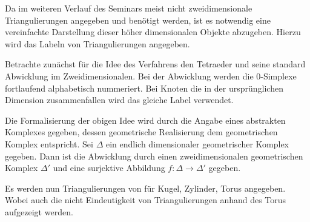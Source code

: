 \begin{Bem}
  Da im weiteren Verlauf des Seminars meist nicht zweidimensionale
  Triangulierungen angegeben und benötigt werden, ist es notwendig
  eine vereinfachte Darstellung dieser höher dimensionalen Objekte
  abzugeben. Hierzu wird das Labeln von Triangulierungen angegeben.

  Betrachte zunächst für die Idee des Verfahrens den Tetraeder und
  seine standard Abwicklung im Zweidimensionalen.
  Bei der Abwicklung werden die $0$-Simplexe fortlaufend alphabetisch
  nummeriert. Bei Knoten die in der ursprünglichen Dimension
  zusammenfallen wird das gleiche Label verwendet.

  Die Formalisierung der obigen Idee wird durch die Angabe eines
  abstrakten Komplexes gegeben, dessen geometrische Realisierung dem
  geometrischen Komplex entspricht. Sei $\Delta$ ein endlich
  dimensionaler geometrischer Komplex gegeben. Dann ist die Abwicklung
  durch einen zweidimensionalen geometrischen Komplex $\Delta'$ und
  eine surjektive Abbildung $f: \Delta \rightarrow \Delta'$ gegeben.


\end{Bem}



\begin{Bsp}
  Es werden nun Triangulierungen von für Kugel, Zylinder, Torus angegeben.
  Wobei auch die nicht Eindeutigkeit von Triangulierungen anhand des Torus
  aufgezeigt werden.
\end{Bsp}













